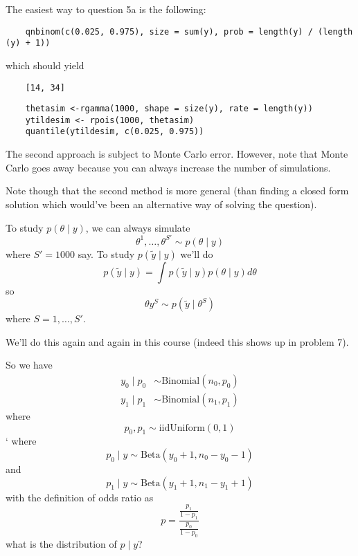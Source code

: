 \documentclass[a4paper]{article}
\begin{document}
The easiest way to question 5a is the following:

\begin{lstlisting}
	qnbinom(c(0.025, 0.975), size = sum(y), prob = length(y) / (length (y) + 1))
\end{lstlisting}
which should yield
\begin{lstlisting}
	[14, 34]
\end{lstlisting}

\begin{lstlisting}
	thetasim <-rgamma(1000, shape = size(y), rate = length(y))
	ytildesim <- rpois(1000, thetasim)
	quantile(ytildesim, c(0.025, 0.975))
\end{lstlisting}

The second approach is subject to Monte Carlo error. However, note that Monte Carlo goes away because you can always increase the number of simulations.

Note though that the second method is more general (than finding a closed form solution which would've been an alternative way of solving the question).

To study $p(\theta \mid y)$, we can always simulate
\begin{equation}
	\theta ^1, \ldots, \theta ^{S'} \sim p\left( \theta \mid y \right)
\end{equation}
where $S' = 1000$ say.
To study $p\left( \tilde{y} \mid y \right)$ we'll do
\begin{equation}
	p\left( \tilde{y} \mid y \right) = \int p\left( \tilde{y} \mid y \right) p\left( \theta \mid y \right) d \theta
\end{equation}
so
\begin{equation}
	\theta{y} ^S \sim p\left( \tilde{y} \mid \theta ^{S} \right)
\end{equation}
where $S = 1, \ldots, S'$.

We'll do this again and again in this course (indeed this shows up in problem 7).

So we have
\begin{align}
	y_0 \mid p_0 &\sim \text{Binomial}(n_0, p_0) \\
	y_1 \mid p_1 &\sim \text{Binomial}(n_1, p_1)
\end{align}
where
\begin{equation}
	p_0, p_1 \sim \text{iid} \text{Uniform}(0, 1)
\end{equation}`
where
\begin{equation}
	p_0 \mid y \sim \text{Beta}(y_0 + 1, n_0 - y_0 - 1)
\end{equation}
and
\begin{equation}
	p_1 \mid y \sim \text{Beta}(y_1 + 1, n_1 - y_1 + 1)
\end{equation}
with the definition of odds ratio as
\begin{equation}
	p = \frac{\frac{p_1}{1 - p_1}}{\frac{p_0}{1 - p_0}}
\end{equation}
what is the distribution of $p \mid y$?
\end{document}
